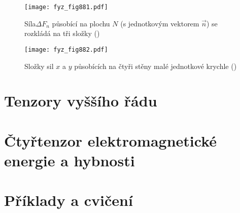     \begin{figure}[ht!] %
      \centering
      \texttt{[image: fyz\_fig881.pdf]}
      \caption{Síla\(\Delta F_n\) působící na plochu \(N\) (s jednotkovým vektorem \(\vec{n}\)) se
               rozkládá na tři složky (\cite[s.~585]{Feynman02})}
      \label{fyz:fig881}
    \end{figure}

    \begin{figure}[ht!] %
      \centering
      \texttt{[image: fyz\_fig882.pdf]}
      \caption{Složky sil \(x\) a \(y\) působících na čtyři stěny malé jednotkové krychle
               (\cite[s.~586]{Feynman02})}
      \label{fyz:fig882}
    \end{figure}
 
  \section{Tenzory vyššího  řádu}\label{fyz:IIchapXXXIsecVII} 
  
  \section{Čtyřtenzor elektromagnetické energie a hybnosti}\label{fyz:IIchapXXXIsecVIII} 
  
  \section{Příklady a cvičení}\label{fyz:IIchapXXXIsecIX}